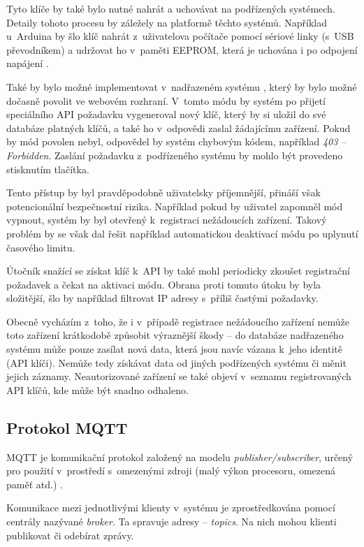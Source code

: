Tyto klíče by také bylo nutné nahrát a uchovávat na podřízených systémech. Detaily tohoto procesu by záležely na platformě těchto systémů. Například u~Arduina by šlo klíč nahrát z~uživatelova počítače pomocí sériové linky (s~USB převodníkem) a udržovat ho v~paměti EEPROM, která je uchována i po odpojení napájení \cite{ard_eeprom}.

Také by bylo možné implementovat v~nadřazeném systému , který by bylo možné dočasně povolit ve webovém rozhraní. V~tomto módu by systém po přijetí speciálního API požadavku vygeneroval nový klíč, který by si uložil do své databáze platných klíčů, a také ho v~odpovědi zaslal žádajícímu zařízení. Pokud by mód povolen nebyl, odpovědel by systém chybovým kódem, například \textit{403 -- Forbidden}. Zaslání požadavku z~podřízeného systému by mohlo být provedeno stisknutím tlačítka.

Tento přístup by byl pravděpodobně uživatelsky příjemnější, přináší však potencionální bezpečnostní rizika. Například pokud by uživatel zapomněl mód vypnout, systém by byl otevřený k~registraci nežádoucích zařízení. Takový problém by se však dal řešit například automatickou deaktivací módu po uplynutí časového limitu.

Útočník snažící se získat klíč k~API by také mohl periodicky zkoušet registrační požadavek a čekat na aktivaci módu. Obrana proti tomuto útoku by byla složitější, šlo by například filtrovat IP adresy s~příliš častými požadavky.

Obecně vycházím z~toho, že i v~případě registrace nežádoucího zařízení nemůže toto zařízení krátkodobě způsobit výraznější škody -- do databáze nadřazeného systému může pouze zasílat nová data, která jsou navíc vázana k~jeho identitě (API klíči). Nemůže tedy získávat data od jiných podřízených systému či měnit jejich záznamy. Neautorizované zařízení se také objeví v~seznamu registrovaných API klíčů, kde může být snadno odhaleno. 

\subsection{Protokol MQTT}
\label{sec:an_mqtt}

MQTT je komunikační protokol založený na modelu \textit{publisher/subscriber}, určený pro použití v~prostředí s~omezenými zdroji (malý výkon procesoru, omezená paměť atd.) \cite{mqtt_valerie}.

Komunikace mezi jednotlivými klienty v~systému je zprostředkována pomocí centrály nazývané \textit{broker}. Ta spravuje adresy -- \textit{topics}. Na nich mohou klienti publikovat či odebírat zprávy.

